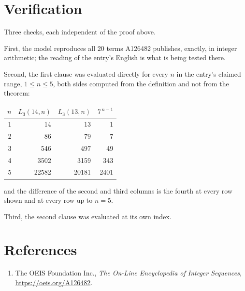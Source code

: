 \documentclass[11pt,a4paper]{article}
\theoremstyle{plain}
\theoremstyle{definition}
\begin{document}
\section{Verification}

Three checks, each independent of the proof above.

First, the model reproduces all $20$ terms A126482 publishes, exactly, in integer
arithmetic; the reading of the entry's English is what is being tested there.

Second, the first clause was evaluated directly for every $n$ in the entry's claimed range,
$1\le n\le5$, both sides computed from the definition and not from the theorem:

\begin{center}
\begin{tabular}{rrrr}
$n$ & $L_{3}(14,n)$ & $L_{3}(13,n)$ & $7^{\,n-1}$ \\ \hline
1 & 14 & 13 & 1 \\
2 & 86 & 79 & 7 \\
3 & 546 & 497 & 49 \\
4 & 3502 & 3159 & 343 \\
5 & 22582 & 20181 & 2401 \\
\end{tabular}
\end{center}

\noindent and the difference of the second and third columns is the fourth at every row shown
and at every row up to $n=5$.

Third, the second clause was evaluated at its own index.

\section*{References}
\begin{enumerate}
\item The OEIS Foundation Inc., \emph{The On-Line Encyclopedia of Integer Sequences},
\url{https://oeis.org/A126482}.
\end{enumerate}
\end{document}
